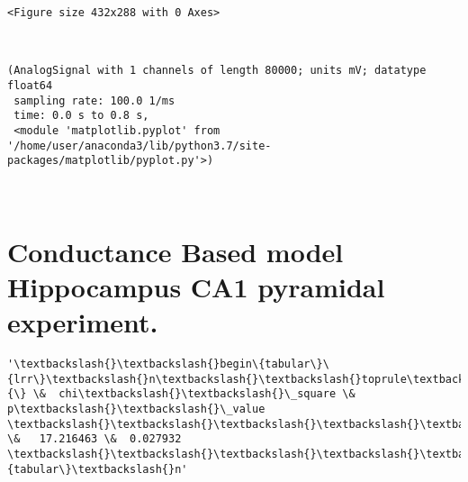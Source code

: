     
    \begin{verbatim}
<Figure size 432x288 with 0 Axes>
    \end{verbatim}

    
    \begin{center}
    \end{center}
    { \hspace*{\fill} \\}
    
            \begin{tcolorbox}[breakable, size=fbox, boxrule=.5pt, pad at break*=1mm, opacityfill=0]
\begin{Verbatim}[commandchars=\\\{\}]
(AnalogSignal with 1 channels of length 80000; units mV; datatype float64
 sampling rate: 100.0 1/ms
 time: 0.0 s to 0.8 s,
 <module 'matplotlib.pyplot' from '/home/user/anaconda3/lib/python3.7/site-
packages/matplotlib/pyplot.py'>)
\end{Verbatim}
\end{tcolorbox}
        
    \begin{center}
    \end{center}
    { \hspace*{\fill} \\}
    
    \hypertarget{conductance-based-model-hippocampus-ca1-pyramidal-experiment.}{%
\section{Conductance Based model Hippocampus CA1 pyramidal
experiment.}\label{conductance-based-model-hippocampus-ca1-pyramidal-experiment.}}

            \begin{tcolorbox}[breakable, size=fbox, boxrule=.5pt, pad at break*=1mm, opacityfill=0]
\begin{Verbatim}[commandchars=\\\{\}]
'\textbackslash{}\textbackslash{}begin\{tabular\}\{lrr\}\textbackslash{}n\textbackslash{}\textbackslash{}toprule\textbackslash{}n\{\} \&  chi\textbackslash{}\textbackslash{}\_square \&   p\textbackslash{}\textbackslash{}\_value
\textbackslash{}\textbackslash{}\textbackslash{}\textbackslash{}\textbackslash{}n\textbackslash{}\textbackslash{}midrule\textbackslash{}n0 \&   17.216463 \&  0.027932
\textbackslash{}\textbackslash{}\textbackslash{}\textbackslash{}\textbackslash{}n\textbackslash{}\textbackslash{}bottomrule\textbackslash{}n\textbackslash{}\textbackslash{}end\{tabular\}\textbackslash{}n'
\end{Verbatim}
\end{tcolorbox}
        
